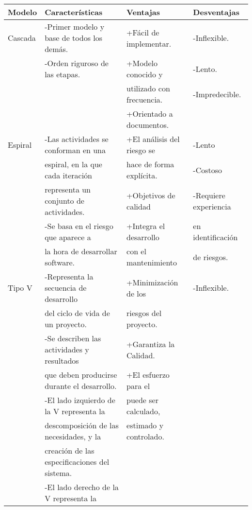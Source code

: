 \begin{table}[ht]
  	\begin{center}
  	\hspace*{-3cm}
	  \begin{tabular}{|l|l|l|l|}
		\hline      
        Modelo			& Características										& Ventajas						& Desventajas			\\
		\hline \hline
    	Cascada			& -Primer modelo y base de todos los demás.			&+Fácil de implementar. 		&-Inflexible.			\\			
    					& -Orden riguroso de las etapas.						&+Modelo conocido y   			&-Lento.					\\	
    					&														&utilizado con frecuencia.		&-Impredecible.			\\
    					& 														&+Orientado a documentos.  		&							\\			
    	\hline
    	Espiral			& -Las actividades se conforman en una  				&+El análisis del riesgo se 	&-Lento				\\
    					& espiral, en la que cada iteración 					&hace de forma explícita. 		&-Costoso				\\
    					& representa un conjunto de actividades.				&+Objetivos de calidad			&-Requiere experiencia\\
    					& -Se basa en el riesgo que aparece a 					&+Integra el desarrollo 		& en identificación	\\    
    					& la hora de desarrollar software.						&con el mantenimiento			& de riesgos.						\\	
    	\hline
    	Tipo V			& -Representa la secuencia de desarrollo 				&+Minimización de los  			&-Inflexible.			\\ 
    					&  del ciclo de vida de un proyecto.					&riesgos del proyecto.			&							\\ 
    					& -Se describen las actividades y resultados 			&+Garantiza la Calidad.			&							\\ 
    					& que deben producirse durante el desarrollo.			&+El esfuerzo para el 			&							\\	
    					& -El lado izquierdo de la V representa la 			&puede ser	calculado,			&							\\	
    					& descomposición de las necesidades, y la  			&estimado y controlado.  		&							\\	
    					& creación de las especificaciones del sistema. 		&								&							\\	
    					& -El lado derecho de la V representa la 				&  								&							\\	

\end{tabular}
\end{center}
\end{table}
